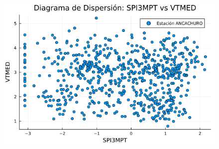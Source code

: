 \begin{figure}[htbp]
\begin{minipage}{0.32\textwidth}
    \includegraphics[width=\linewidth]{Capitulos/Scaterplot/ANCACHURO_SPI3MPT_vs_VTMED.png}
\end{minipage}

\vspace{0.5cm}  %


\end{figure}
